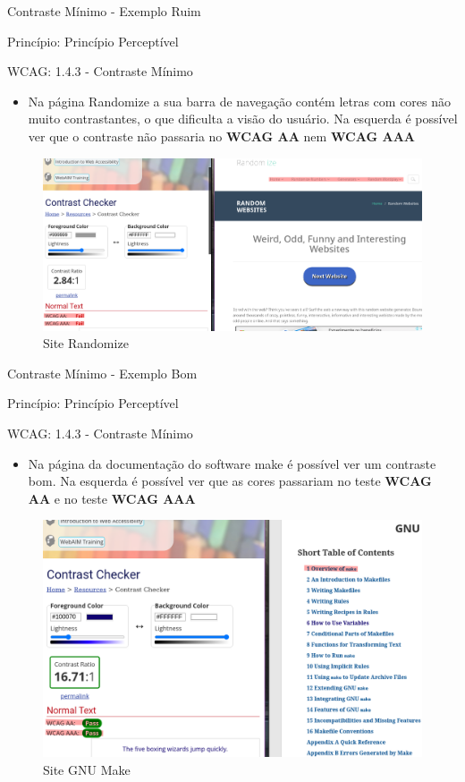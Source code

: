\documentclass{beamer}
\begin{document}
\begin{frame}{Contraste Mínimo - Exemplo Ruim}

Princípio: Princípio Perceptível

WCAG: 1.4.3 - Contraste Mínimo

\begin{itemize}
	\item Na página Randomize a sua barra de navegação contém letras com cores não muito contrastantes, o que dificulta a visão do usuário. Na esquerda é possível ver que o contraste não passaria no \textbf{WCAG AA} nem \textbf{WCAG AAA}
\end{itemize}
\begin{figure}
    \centering
    \includegraphics[scale=0.2]{images/no_contrast.png}
    \caption{Site Randomize}
\end{figure}

\end{frame}
\begin{frame}{Contraste Mínimo - Exemplo Bom}

Princípio: Princípio Perceptível

WCAG: 1.4.3 - Contraste Mínimo

\begin{itemize}
	\item Na página da documentação do software make é possível ver um contraste bom. Na esquerda é possível ver que as cores passariam no teste \textbf{WCAG AA} e no teste \textbf{WCAG AAA}
\end{itemize}
\begin{figure}
    \centering
    \includegraphics[scale=0.2]{images/contrast.png}
    \caption{Site GNU Make}
\end{figure}
\end{frame}
\end{document}
